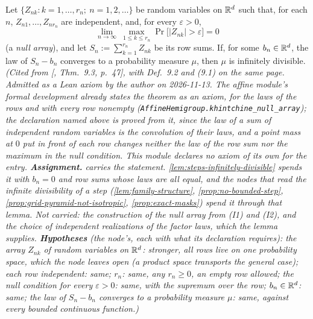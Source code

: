 \begin{theorem}
\label{thm:cited-A41}
\leanok
Let $\{Z_{nk} : k = 1, \dots, r_n;\ n = 1, 2, \dots\}$ be random variables on $\mathbb{R}^d$ such that, for
each $n$, $Z_{n1}, \dots, Z_{nr_n}$ are independent, and, for every $\varepsilon > 0$,
\[
  \lim_{n \to \infty}\ \max_{1 \le k \le r_n}\Pr\bigl[|Z_{nk}| > \varepsilon\bigr] = 0
\]
(a \emph{null array}), and let $S_n := \sum_{k=1}^{r_n}Z_{nk}$ be its row sums. If, for some
$b_n \in \mathbb{R}^d$, the law of $S_n - b_n$ converges to a probability measure $\mu$, then $\mu$ is
infinitely divisible.
\statusA\quad{}\quad\emph{(Cited from [, Thm.~9.3, p.~47], with
Def.~9.2 and (9.1) on the same page. Admitted as a Lean axiom by the author on 2026-11-13. The
affine module's formal development already states the theorem as an axiom, for the laws of the
rows and with every row nonempty (\texttt{AffineHemigroup.khintchine\_null\_array}); the
declaration named above is proved from it, since the law of a sum of independent random variables
is the convolution of their laws, and a point mass at $0$ put in front of each row changes neither
the law of the row sum nor the maximum in the null condition. This module declares no axiom of its
own for the entry.
\textbf{Assignment.}  carries the statement. \ref{lem:steps-infinitely-divisible}
spends it with $b_n = 0$ and row sums whose laws are all equal, and the nodes that read the
infinite divisibility of a step (\ref{lem:family-structure}, \ref{prop:no-bounded-step},
\ref{prop:grid-pyramid-not-isotropic}, \ref{prop:exact-masks}) spend it through that lemma. Not
carried: the construction of the null array from (I1) and (I2), and the choice of independent
realizations of the factor laws, which the lemma supplies.
\textbf{Hypotheses} (the node's, each with what its declaration requires): the array $Z_{nk}$ of random
variables on $\mathbb{R}^d$: stronger, all rows live on one probability space, which the node leaves
open (a product space transports the general case); each row independent: same; $r_n$: same, any
$r_n \ge 0$, an empty row allowed; the null condition for every $\varepsilon > 0$: same, with the
supremum over the row; $b_n \in \mathbb{R}^d$: same; the law of $S_n - b_n$ converges to a probability
measure $\mu$: same, against every bounded continuous function.)}
\end{theorem}

